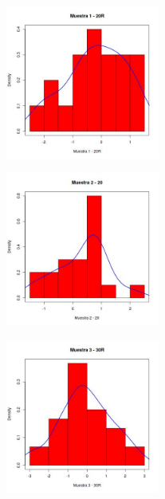 \documentclass[a4paper,10pt,twocolumn]{report}
\begin{document}
	\begin{figure}[H]
		\centering
		\includegraphics[width=0.45\textwidth]{img/ex2/Histograms/Histogram1.jpeg}
		\label{hist:2.1}
	\end{figure}
	
	\begin{figure}[H]
		\centering
		\includegraphics[width=0.45\textwidth]{img/ex2/Histograms/Histogram2.jpeg}
		\label{hist:2.2}
	\end{figure}
	
	\begin{figure}[H]
		\centering
		\includegraphics[width=0.45\textwidth]{img/ex2/Histograms/Histogram3.jpeg}
		\label{hist:2.3}	
	\end{figure}
	
\end{document}
